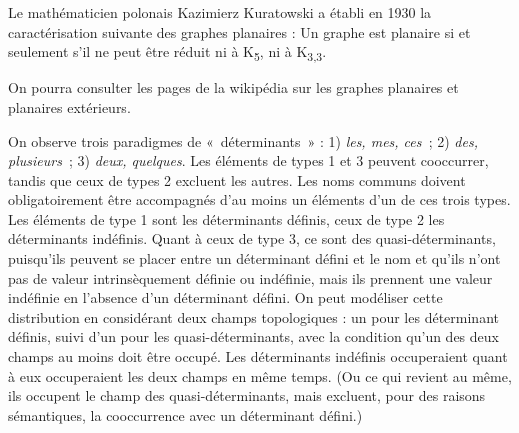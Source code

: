 {    \begin{center}
    \begin{minipage}[c]{.5\linewidth}\centering
    \end{minipage}\begin{minipage}[c]{.5\linewidth}\centering
    \end{minipage}
    \end{center}

    Le mathématicien polonais Kazimierz Kuratowski a établi en 1930 la caractérisation suivante des graphes planaires : Un graphe est planaire si et seulement s’il ne peut être réduit ni à K\textsubscript{5}, ni à K\textsubscript{3,3}.

    On pourra consulter les pages de la wikipédia sur les graphes planaires et planaires extérieurs.

     On observe trois paradigmes de «~déterminants~» : 1) \textit{les, mes, ces~}; 2) \textit{des, plusieurs~}; 3) \textit{deux, quelques}. Les éléments de types 1 et 3 peuvent cooccurrer, tandis que ceux de types 2 excluent les autres. Les noms communs doivent obligatoirement être accompagnés d’au moins un éléments d’un de ces trois types. Les éléments de type 1 sont les déterminants définis, ceux de type 2 les déterminants indéfinis. Quant à ceux de type 3, ce sont des quasi-déterminants, puisqu’ils peuvent se placer entre un déterminant défini et le nom et qu’ils n’ont pas de valeur intrinsèquement définie ou indéfinie, mais ils prennent une valeur indéfinie en l’absence d’un déterminant défini. On peut modéliser cette distribution en considérant deux champs topologiques : un pour les déterminant définis, suivi d’un pour les quasi-déterminants, avec la condition qu’un des deux champs au moins doit être occupé. Les déterminants indéfinis occuperaient quant à eux occuperaient les deux champs en même temps. (Ou ce qui revient au même, ils occupent le champ des quasi-déterminants, mais excluent, pour des raisons sémantiques, la cooccurrence avec un déterminant défini.)

}
